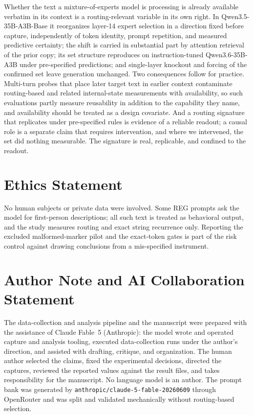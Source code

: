 \documentclass[10pt,a4paper,twocolumn]{article}
\begin{document}
Whether the text a mixture-of-experts model is processing is already
available verbatim in its context is a routing-relevant variable in its own
right. In Qwen3.5-35B-A3B-Base it reorganizes layer-14 expert selection in a
direction fixed before capture, independently of token identity, prompt
repetition, and measured predictive certainty; the shift is carried in
substantial part by attention retrieval of the prior copy; its set structure
reproduces on instruction-tuned Qwen3.6-35B-A3B under pre-specified
predictions; and single-layer knockout and forcing of the confirmed set leave
generation unchanged. Two consequences follow for practice. Multi-turn probes
that place later target text in earlier context contaminate routing-based and
related internal-state measurements with availability, so such evaluations
partly measure reusability in addition to the capability they name, and
availability should be treated as a design covariate. And a routing
signature that replicates under pre-specified rules is evidence of a reliable
readout; a causal role is a separate claim that requires intervention, and where we intervened, the set did nothing measurable.
The signature is real, replicable, and confined to the readout.

\section*{Ethics Statement}

No human subjects or private data were involved. Some REG prompts ask the
model for first-person descriptions; all such text is treated as behavioral
output, and the study measures routing and exact string recurrence only.
Reporting the excluded malformed-marker pilot and the exact-token gates is
part of the risk control against drawing conclusions from a mis-specified
instrument.

\section*{Author Note and AI Collaboration Statement}

The data-collection and analysis pipeline and the manuscript were prepared
with the assistance of Claude Fable~5 (Anthropic): the model wrote and
operated capture and analysis tooling, executed data-collection runs under the
author's direction, and assisted with drafting, critique, and organization.
The human author selected the claims, fixed the experimental decisions,
directed the captures, reviewed the reported values against the result files,
and takes responsibility for the manuscript. No language model is an author.
The prompt bank was generated by \texttt{anthropic/claude-5-fable-20260609}
through OpenRouter and was split and validated mechanically without
routing-based selection.
\end{document}
